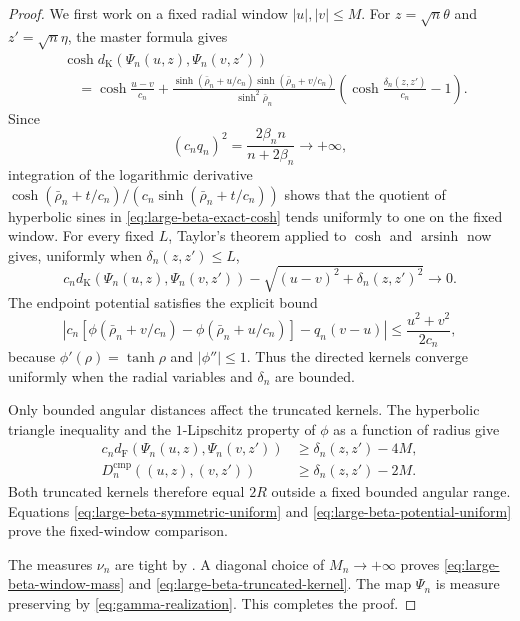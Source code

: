\documentclass{amsart}
\numberwithin{equation}{section}
\theoremstyle{plain}
\theoremstyle{definition}
\theoremstyle{remark}
\DeclareMathOperator{\arsinh}{arsinh}
\newcommand{\dF}{d_{\mathrm F}}
\newcommand{\dK}{d_{\mathrm K}}
\begin{document}
\begin{proof}
We first work on a fixed radial window $|u|,|v|\le M$.  For $z=\sqrt n\theta$ and $z'=\sqrt n\eta$, the master formula gives
\begin{equation}\label{eq:large-beta-exact-cosh}
 \begin{split}
 &\cosh\dK(\Psi_n(u,z),\Psi_n(v,z'))\\
 &\quad=\cosh\frac{u-v}{c_n}
 +\frac{\sinh(\bar\rho_n+u/c_n)
 \sinh(\bar\rho_n+v/c_n)}{\sinh^2\bar\rho_n}
 \left(\cosh\frac{\delta_n(z,z')}{c_n}-1\right).
 \end{split}
\end{equation}
Since
\[ (c_nq_n)^2=\frac{2\beta_n n}{n+2\beta_n}\longrightarrow+\infty, \]
integration of the logarithmic derivative
$\cosh(\bar\rho_n+t/c_n)/(c_n\sinh(\bar\rho_n+t/c_n))$ shows that the quotient of hyperbolic sines in \eqref{eq:large-beta-exact-cosh} tends uniformly to one on the fixed window.  For every fixed $L$, Taylor's theorem applied to $\cosh$ and $\arsinh$ now gives, uniformly when $\delta_n(z,z')\le L$,
\begin{equation}\label{eq:large-beta-symmetric-uniform} c_n\dK(\Psi_n(u,z),\Psi_n(v,z')) -\sqrt{(u-v)^2+\delta_n(z,z')^2} \longrightarrow0. \end{equation}
The endpoint potential satisfies the explicit bound
\begin{equation}\label{eq:large-beta-potential-uniform} \left|c_n\left[ \phi(\bar\rho_n+v/c_n)-\phi(\bar\rho_n+u/c_n) \right]-q_n(v-u)\right| \le\frac{u^2+v^2}{2c_n}, \end{equation}
because $\phi'(\rho)=\tanh\rho$ and $|\phi''|\le1$.  Thus the directed kernels converge uniformly when the radial variables and $\delta_n$ are bounded.

Only bounded angular distances affect the truncated kernels.  The hyperbolic triangle inequality and the $1$-Lipschitz property of $\phi$ as a function of radius give
\begin{align*}
c_n\dF(\Psi_n(u,z),\Psi_n(v,z')) &\ge\delta_n(z,z')-4M,\\
D_n^{\mathrm{cmp}}((u,z),(v,z')) &\ge\delta_n(z,z')-2M.
\end{align*}
Both truncated kernels therefore equal $2R$ outside a fixed bounded angular range.  Equations \eqref{eq:large-beta-symmetric-uniform} and \eqref{eq:large-beta-potential-uniform} prove the fixed-window comparison.

The measures $\nu_n$ are tight by .  A diagonal choice of $M_n\to+\infty$ proves \eqref{eq:large-beta-window-mass} and \eqref{eq:large-beta-truncated-kernel}.  The map $\Psi_n$ is measure preserving by \eqref{eq:gamma-realization}.  This completes the proof.
\end{proof}
\end{document}
